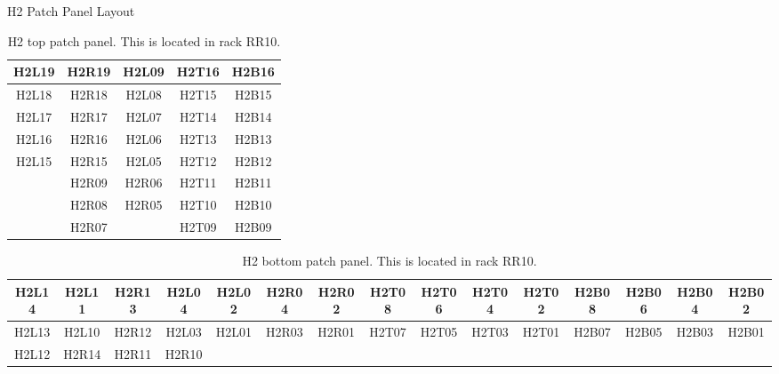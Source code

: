 \documentclass[10pt, xcolor={dvipsnames}, aspectratio = 169, sans,mathserif]{beamer}
\begin{document}
\begin{frame}{H2 Patch Panel Layout}
\begin{table}
\begin{center}
\begin{tabular}{|c|c|c|c|c|}
\hline
H2L19 & H2R19 & H2L09 & H2T16 & H2B16 \\
\hline
H2L18 & H2R18 & H2L08 & H2T15 & H2B15 \\
\hline
H2L17 & H2R17 & H2L07 & H2T14 & H2B14 \\
\hline
H2L16 & H2R16 & H2L06 & H2T13 & H2B13 \\
\hline
H2L15 & H2R15 & H2L05 & H2T12 & H2B12 \\
\hline
      & H2R09 & H2R06 & H2T11 & H2B11 \\
\hline
      & H2R08 & H2R05 & H2T10 & H2B10 \\
\hline
      & H2R07 &       & H2T09 & H2B09 \\
\hline
\end{tabular}
\caption{H2 top patch panel. This is located in rack RR10.}
\end{center}
\end{table}

\begin{tiny}
\begin{table}
\begin{center}
\begin{tabular}{|c|c|c|c|c|c|c|c|c|c|c|c|c|c|c|}
\hline
H2L14 & H2L11 & H2R13 & H2L04 & H2L02 & H2R04 & H2R02 & H2T08 & H2T06 & H2T04 & H2T02 & H2B08 & H2B06 & H2B04 & H2B02 \\
\hline
H2L13 & H2L10 & H2R12 & H2L03 & H2L01 & H2R03 & H2R01 & H2T07 & H2T05 & H2T03 & H2T01 & H2B07 & H2B05 & H2B03 & H2B01 \\
\hline
H2L12 & H2R14 & H2R11 & H2R10 &       &       &       &       &       &       &       &       &       &       &       \\
\hline
\end{tabular}
\caption{H2 bottom patch panel. This is located in rack RR10.}
\end{center}
\end{table}
\end{tiny}

\end{frame}
\end{document}
